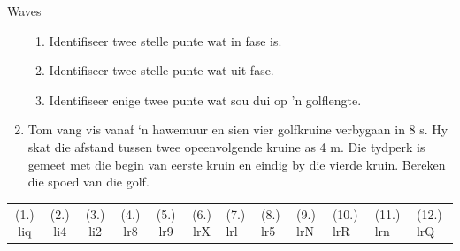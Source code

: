 \begin{definition}
\begin{exercises}{Waves }
\begin{enumerate}[noitemsep, label=\textbf{\arabic*}. ]
\begin{figure}[H]
 \end{figure}       \label{m38806*id321157}\begin{enumerate}[noitemsep, label=\textbf{\alph*}. ] 
            \label{m38806*uid55}\item Identifiseer twee stelle punte wat in fase is.
\label{m38806*uid56}\item Identifiseer twee stelle punte wat uit fase.
\label{m38806*uid57}\item Identifiseer enige twee punte wat sou dui op 'n golflengte.
\end{enumerate}
                \label{m38806*uid58}\item Tom vang vis vanaf ‘n hawemuur en sien vier golfkruine verbygaan in 8 s. Hy  skat die 
            afstand tussen twee opeenvolgende kruine as 4 m. Die tydperk is gemeet met die begin
            van eerste kruin en eindig by die vierde kruin. Bereken die spoed van die golf.
\end{enumerate}
\practiceinfo
 \par \begin{tabular}[h]{cccccc}
 (1.) liq  &  (2.) li4  &  (3.) li2  &  (4.) lr8  &  (5.) lr9  &  (6.) lrX  &  (7.) lrl  &  (8.) lr5  &  (9.) lrN  &  (10.) lrR  &  (11.) lrn  &  (12.) lrQ  & \end{tabular}

\end{exercises}    


\end{definition}

